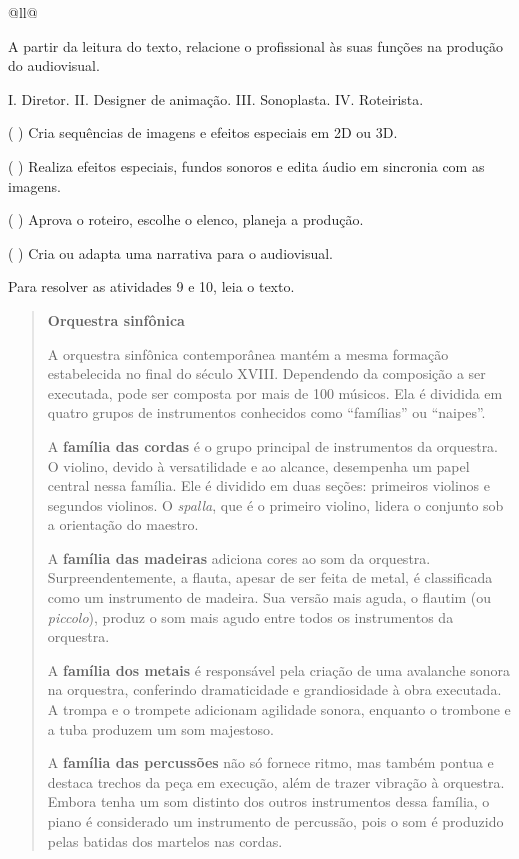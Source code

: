 \begin{itemize}
\begin{itemize}
\begin{escolha}[]{@{}ll@{}}
\begin{quote}
\end{quote}

A partir da leitura do texto, relacione o profissional às suas funções
na produção do audiovisual.

I. Diretor.
II. Designer de animação.
III.  Sonoplasta.
IV. Roteirista.

(  ) Cria sequências de imagens e efeitos especiais em 2D ou 3D.

(  ) Realiza efeitos especiais, fundos sonoros e edita áudio em sincronia com as imagens.

(  ) Aprova o roteiro, escolhe o elenco, planeja a produção.

(  ) Cria ou adapta uma narrativa para o audiovisual.

Para resolver as atividades 9 e 10, leia o texto.

\begin{quote}
\textbf{Orquestra sinfônica}

A orquestra sinfônica contemporânea mantém a mesma formação 
estabelecida no final do século XVIII. Dependendo da composição 
a ser executada, pode ser composta por mais de 100 músicos. Ela 
é dividida em quatro grupos de instrumentos conhecidos como ``famílias'' 
ou ``naipes''.

A \textbf{família das cordas} é o grupo principal de instrumentos 
da orquestra. O violino, devido à versatilidade e ao alcance, desempenha 
um papel central nessa família. Ele é dividido em duas seções: primeiros 
violinos e segundos violinos. O \textit{spalla}, que é o primeiro violino, 
lidera o conjunto sob a orientação do maestro.

A \textbf{família das madeiras} adiciona cores ao som da orquestra. 
Surpreendentemente, a flauta, apesar de ser feita de metal, é classificada 
como um instrumento de madeira. Sua versão mais aguda, o flautim (ou 
\textit{piccolo}), produz o som mais agudo entre todos os instrumentos da 
orquestra.

A \textbf{família dos metais} é responsável pela criação de uma avalanche 
sonora na orquestra, conferindo dramaticidade e grandiosidade à obra executada. 
A trompa e o trompete adicionam agilidade sonora, enquanto o trombone e a tuba 
produzem um som majestoso.

A \textbf{família das percussões} não só fornece ritmo, mas também pontua e destaca 
trechos da peça em execução, além de trazer vibração à orquestra. Embora tenha um 
som distinto dos outros instrumentos dessa família, o piano é considerado um 
instrumento de percussão, pois o som é produzido pelas batidas dos martelos nas 
cordas.


\end{quote}
\end{escolha}
\end{itemize}
\end{itemize}
